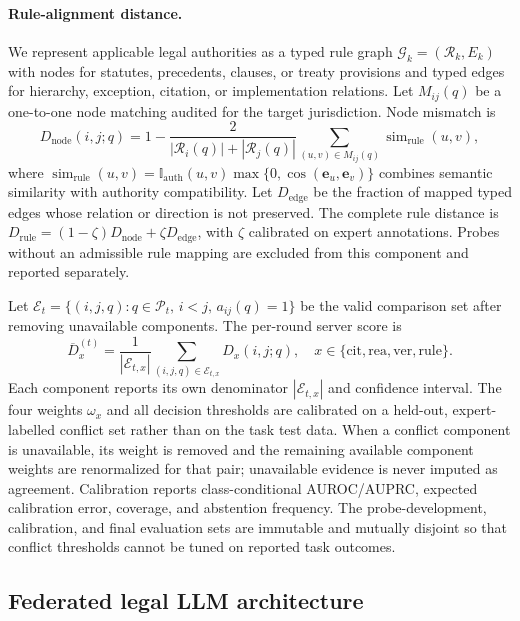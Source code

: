 \documentclass[preprint,12pt,authoryear]{elsarticle}
\newcommand{\graph}{\mathcal{G}}
\newcommand{\rules}{\mathcal{R}}
\begin{document}
\paragraph{Rule-alignment distance.}
We represent applicable legal authorities as a typed rule graph $\graph_k=(\rules_k,E_k)$ with nodes for statutes, precedents, clauses, or treaty provisions and typed edges for hierarchy, exception, citation, or implementation relations. Let $M_{ij}(q)$ be a one-to-one node matching audited for the target jurisdiction. Node mismatch is
\begin{equation}
    D_{\mathrm{node}}(i,j;q) =
    1 - \frac{2}{|\rules_i(q)|+|\rules_j(q)|}
    \sum_{(u,v)\in M_{ij}(q)}
    \operatorname{sim}_{\mathrm{rule}}(u,v),
\end{equation}
where $\operatorname{sim}_{\mathrm{rule}}(u,v)=\mathbb{I}_{\mathrm{auth}}(u,v)\max\{0,\cos(\bm{e}_u,\bm{e}_v)\}$ combines semantic similarity with authority compatibility. Let $D_{\mathrm{edge}}$ be the fraction of mapped typed edges whose relation or direction is not preserved. The complete rule distance is $D_{\mathrm{rule}}=(1-\zeta)D_{\mathrm{node}}+\zeta D_{\mathrm{edge}}$, with $\zeta$ calibrated on expert annotations. Probes without an admissible rule mapping are excluded from this component and reported separately.

Let $\mathcal{E}_t=\{(i,j,q):q\in\mathcal{P}_t,\,i<j,\,a_{ij}(q)=1\}$ be the valid comparison set after removing unavailable components. The per-round server score is
\begin{equation}
    \overline{D}_{x}^{(t)} =
    \frac{1}{|\mathcal{E}_{t,x}|}
    \sum_{(i,j,q)\in\mathcal{E}_{t,x}} D_{x}(i,j;q),
    \quad x \in \{\mathrm{cit},\mathrm{rea},\mathrm{ver},\mathrm{rule}\}.
\end{equation}
Each component reports its own denominator $|\mathcal{E}_{t,x}|$ and confidence interval. The four weights $\omega_x$ and all decision thresholds are calibrated on a held-out, expert-labelled conflict set rather than on the task test data.
When a conflict component is unavailable, its weight is removed and the remaining available component weights are renormalized for that pair; unavailable evidence is never imputed as agreement. Calibration reports class-conditional AUROC/AUPRC, expected calibration error, coverage, and abstention frequency. The probe-development, calibration, and final evaluation sets are immutable and mutually disjoint so that conflict thresholds cannot be tuned on reported task outcomes.

\subsection{Federated legal LLM architecture}
\end{document}
